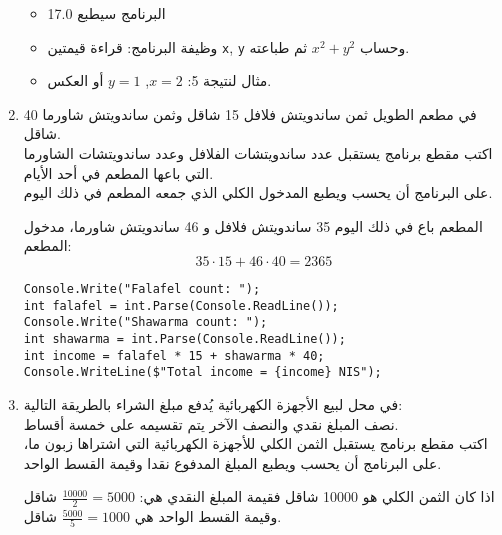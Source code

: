 \documentclass[12pt]{article}
\begin{document}
\begin{enumerate}[itemsep=2em]
\ifwithsols
\begin{boxSolution}
\begin{itemize}
    \item البرنامج سيطبع 17.0
  \item وظيفة البرنامج: قراءة قيمتين \texttt{x}, \texttt{y} وحساب \(x^2 + y^2\) ثم طباعته.
  \item مثال لنتيجة 5: \(x = 2\), \(y = 1\) أو العكس.
\end{itemize}
\end{boxSolution}
\fi

\clearpage
\item
    في مطعم الطويل ثمن ساندويتش فلافل 15 شاقل وثمن ساندويتش شاورما 40 شاقل. \\
    اكتب مقطع برنامج يستقبل عدد ساندويتشات الفلافل وعدد ساندويتشات الشاورما التي باعها المطعم في أحد الأيام. \\
    على البرنامج أن يحسب ويطبع المدخول الكلي الذي جمعه المطعم في ذلك اليوم. \\
    \begin{boxExample}
        المطعم باع في ذلك اليوم 35 ساندويتش فلافل و 46 ساندويتش شاورما، مدخول المطعم: \\
        $$35 \cdot 15 + 46 \cdot 40 = 2365$$
    \end{boxExample}

\ifwithsols
\begin{boxSolution}
\begin{english}
\begin{verbatim}
Console.Write("Falafel count: ");
int falafel = int.Parse(Console.ReadLine());
Console.Write("Shawarma count: ");
int shawarma = int.Parse(Console.ReadLine());
int income = falafel * 15 + shawarma * 40;
Console.WriteLine($"Total income = {income} NIS");
\end{verbatim}
\end{english}
\end{boxSolution}
\fi

    \item
	في محل لبيع الأجهزة الكهربائية يُدفع مبلغ الشراء بالطريقة التالية: \\
     نصف المبلغ نقدي والنصف الآخر يتم تقسيمه على خمسة أقساط. \\
      اكتب مقطع برنامج يستقبل الثمن الكلي للأجهزة الكهربائية التي اشتراها زبون ما، على البرنامج أن يحسب ويطبع المبلغ المدفوع نقدا وقيمة القسط الواحد.  \\
    \begin{boxExample}
        اذا كان الثمن الكلي هو 10000 شاقل فقيمة المبلغ النقدي هي: $\frac{10000}{2}=5000$ شاقل وقيمة القسط الواحد هي $\frac{5000}{5}=1000$ شاقل.
    \end{boxExample}


\end{enumerate}
\end{document}

